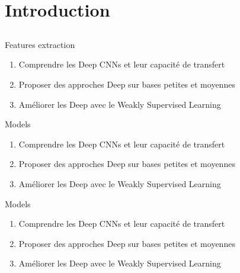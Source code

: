 \section{Introduction} \subsection{}\label{}

\begin{frame}{Features extraction}
	
	
	\begin{enumerate}
		\item Comprendre les Deep CNNs et leur capacité de transfert
		\item Proposer des approches Deep sur bases petites et moyennes
		\item Améliorer les Deep avec le Weakly Supervised Learning
	\end{enumerate}
		

\end{frame}



\begin{frame}{Models}
	
		
		\begin{enumerate}
			\item Comprendre les Deep CNNs et leur capacité de transfert
			\item Proposer des approches Deep sur bases petites et moyennes
			\item Améliorer les Deep avec le Weakly Supervised Learning
		\end{enumerate}
		
\end{frame}


\begin{frame}{Models}
	
	
	\begin{enumerate}
		\item Comprendre les Deep CNNs et leur capacité de transfert
		\item Proposer des approches Deep sur bases petites et moyennes
		\item Améliorer les Deep avec le Weakly Supervised Learning
	\end{enumerate}
	
\end{frame}




